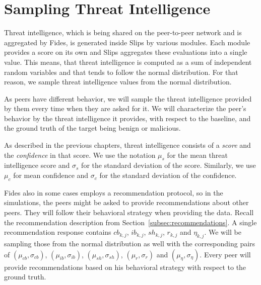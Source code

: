 \section{Sampling Threat Intelligence}
\label{sec:sampling-threat-intelligence}
Threat intelligence, which is being shared on the peer-to-peer network and is aggregated by Fides, is generated inside Slips by various modules.
Each module provides a score on its own and Slips aggregates these evaluations into a single value. 
This means, that threat intelligence is computed as a sum of independent random variables and that tends to follow the normal distribution. 
For that reason, we sample threat intelligence values from the normal distribution.

As peers have different behavior, we will sample the threat intelligence provided by them every time when they are asked for it.
We will characterize the peer's behavior by the threat intelligence it provides, with respect to the baseline, and the ground truth of the target being benign or malicious.

As described in the previous chapters, threat intelligence consists of a \textit{score} and the \textit{confidence} in that score.
We use the notation $\mu_{s}$ for the mean threat intelligence score and $\sigma_{s}$ for the standard deviation of the score. 
Similarly, we use $\mu_{c}$ for mean confidence and $\sigma_{c}$ for the standard deviation of the confidence. 

Fides also in some cases employs a recommendation protocol, so in the simulations, the peers might be asked to provide recommendations about other peers.
They will follow their behavioral strategy when providing the data. 
Recall the recommendation description from Section~\ref{subsec:recommendations}. A single recommendation response contains $cb_{k,j}$, $ib_{k,j}$, $sh_{k,j}$, $r_{k,j}$ and $\eta_{k,j}$. 
We will be sampling those from the normal distribution as well with the corresponding pairs of $(\mu_{cb}, \sigma_{cb})$, $(\mu_{ib}, \sigma_{ib})$, $(\mu_{sh}, \sigma_{sh})$, $(\mu_{r}, \sigma_{r})$ and $(\mu_{\eta}, \sigma_{\eta})$.
Every peer will provide recommendations based on his behavioral strategy with respect to the ground truth.

